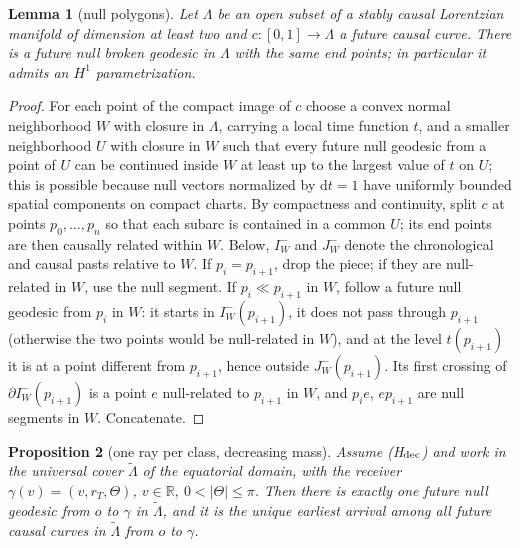 \documentclass[aip,jmp,amsmath,amssymb,reprint]{revtex4-2}
\newcommand{\dd}{\mathrm{d}}
\theoremstyle{plain}
\newtheorem{proposition}{Proposition}[section]
\newtheorem{lemma}[proposition]{Lemma}
\theoremstyle{definition}
\begin{document}
\begin{lemma}[null polygons]\label{lem:null-polygon}
Let $\Lambda$ be an open subset of a stably causal Lorentzian manifold of dimension at least two and
$c:[0,1]\to\Lambda$ a future causal curve. There is a future null broken geodesic in $\Lambda$ with the same end
points; in particular it admits an $H^1$ parametrization.
\end{lemma}

\begin{proof}
For each point of the compact image of $c$ choose a convex normal neighborhood $W$ with closure in $\Lambda$,
carrying a local time function $t$, and a smaller neighborhood $U$ with closure in $W$ such that every
future null geodesic from a point of $U$ can be continued inside $W$ at least up to the largest
value of $t$ on $U$; this is possible because null vectors normalized by $\dd t=1$ have uniformly
bounded spatial components on compact charts. By compactness and continuity, split $c$ at points
$p_0,\dots,p_n$ so that each subarc is contained in a common $U$; its end points are then causally related
within $W$. Below, $I^-_W$ and $J^-_W$ denote the chronological and causal pasts relative to $W$. If $p_i=p_{i+1}$, drop the piece; if they are null-related in $W$, use the null
segment. If $p_i\ll p_{i+1}$ in $W$, follow a future null geodesic from $p_i$ in $W$: it starts in $I^-_W(p_{i+1})$, it
does not pass through $p_{i+1}$ (otherwise the two points would be null-related in $W$), and at the level
$t(p_{i+1})$ it is at a point different from $p_{i+1}$, hence outside $J^-_W(p_{i+1})$. Its first crossing of
$\partial I^-_W(p_{i+1})$ is a point $e$ null-related to $p_{i+1}$ in $W$, and $p_ie$, $ep_{i+1}$ are null segments in $W$.
Concatenate.
\end{proof}

\begin{proposition}[one ray per class, decreasing mass]\label{prop:vaidya-dec-count}
Assume (H$_{\rm dec}$) and work in the universal cover $\tilde\Lambda$ of the equatorial domain, with the receiver
$\gamma(v)=(v,r_T,\Theta)$, $v\in\mathbb R$, $0<|\Theta|\le\pi$. Then there is exactly one future null geodesic from $o$ to
$\gamma$ in $\tilde\Lambda$, and it is the unique earliest arrival among all future causal curves in $\tilde\Lambda$ from
$o$ to $\gamma$.
\end{proposition}
\end{document}
